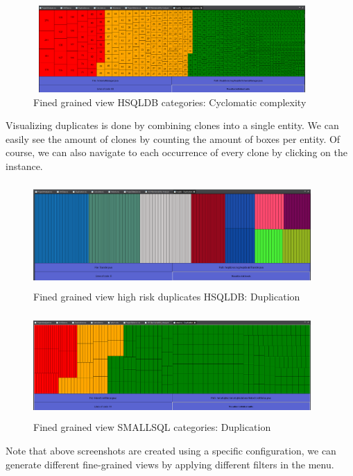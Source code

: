 \documentclass{article}
\begin{document}
\begin{figure}[!htbp]
	\centering
	\label{fig:cyclomatic-complexity-cat}
	\caption{Fined grained view HSQLDB categories: Cyclomatic complexity}
	\includegraphics[width=400px, height=125px]{hsqldb_coc_cat.png}
\end{figure}

Visualizing duplicates is done by combining clones into a single entity. 
We can easily see the amount of clones by counting the amount of boxes per entity.
Of course, we can also navigate to each occurrence of every clone by clicking on the instance.

\begin{figure}[!htbp]
	\centering
	\label{fig:duplication}
	\caption{Fined grained view high risk duplicates HSQLDB: Duplication}
	\includegraphics[width=400px, height=150px]{hsqldb_duplication.png}
\end{figure}

\begin{figure}[!htbp]
	\centering
	\label{fig:duplication-cat}
	\caption{Fined grained view SMALLSQL categories: Duplication}
	\includegraphics[width=400px, height=150px]{smallsql_duplication_cat.png}
\end{figure}

\clearpage
Note that above screenshots are created using a specific configuration, we can generate different fine-grained views by applying different filters in the menu.
\end{document}
